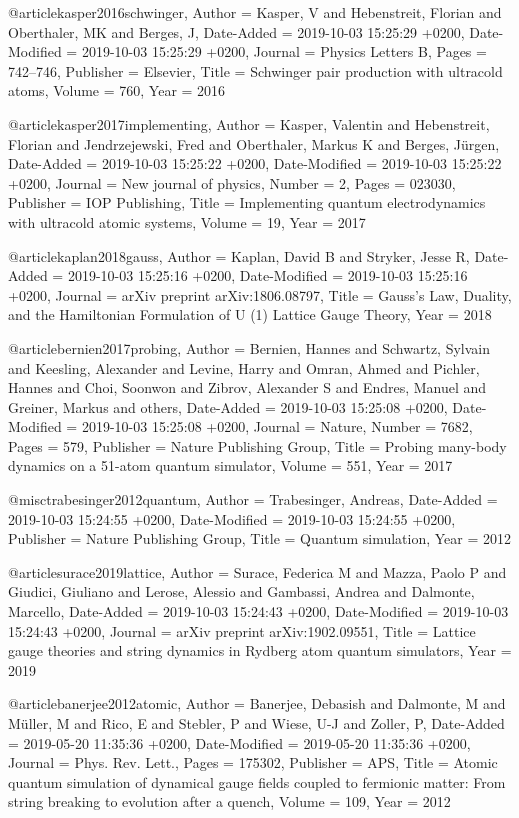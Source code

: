\documentclass[epj,final]{svjour}
\begin{document}
@article{kasper2016schwinger,
	Author = {Kasper, V and Hebenstreit, Florian and Oberthaler, MK and Berges, J},
	Date-Added = {2019-10-03 15:25:29 +0200},
	Date-Modified = {2019-10-03 15:25:29 +0200},
	Journal = {Physics Letters B},
	Pages = {742--746},
	Publisher = {Elsevier},
	Title = {Schwinger pair production with ultracold atoms},
	Volume = {760},
	Year = {2016}}

@article{kasper2017implementing,
	Author = {Kasper, Valentin and Hebenstreit, Florian and Jendrzejewski, Fred and Oberthaler, Markus K and Berges, J{\"u}rgen},
	Date-Added = {2019-10-03 15:25:22 +0200},
	Date-Modified = {2019-10-03 15:25:22 +0200},
	Journal = {New journal of physics},
	Number = {2},
	Pages = {023030},
	Publisher = {IOP Publishing},
	Title = {Implementing quantum electrodynamics with ultracold atomic systems},
	Volume = {19},
	Year = {2017}}

@article{kaplan2018gauss,
	Author = {Kaplan, David B and Stryker, Jesse R},
	Date-Added = {2019-10-03 15:25:16 +0200},
	Date-Modified = {2019-10-03 15:25:16 +0200},
	Journal = {arXiv preprint arXiv:1806.08797},
	Title = {Gauss's Law, Duality, and the Hamiltonian Formulation of U (1) Lattice Gauge Theory},
	Year = {2018}}

@article{bernien2017probing,
	Author = {Bernien, Hannes and Schwartz, Sylvain and Keesling, Alexander and Levine, Harry and Omran, Ahmed and Pichler, Hannes and Choi, Soonwon and Zibrov, Alexander S and Endres, Manuel and Greiner, Markus and others},
	Date-Added = {2019-10-03 15:25:08 +0200},
	Date-Modified = {2019-10-03 15:25:08 +0200},
	Journal = {Nature},
	Number = {7682},
	Pages = {579},
	Publisher = {Nature Publishing Group},
	Title = {Probing many-body dynamics on a 51-atom quantum simulator},
	Volume = {551},
	Year = {2017}}

@misc{trabesinger2012quantum,
	Author = {Trabesinger, Andreas},
	Date-Added = {2019-10-03 15:24:55 +0200},
	Date-Modified = {2019-10-03 15:24:55 +0200},
	Publisher = {Nature Publishing Group},
	Title = {Quantum simulation},
	Year = {2012}}

@article{surace2019lattice,
	Author = {Surace, Federica M and Mazza, Paolo P and Giudici, Giuliano and Lerose, Alessio and Gambassi, Andrea and Dalmonte, Marcello},
	Date-Added = {2019-10-03 15:24:43 +0200},
	Date-Modified = {2019-10-03 15:24:43 +0200},
	Journal = {arXiv preprint arXiv:1902.09551},
	Title = {Lattice gauge theories and string dynamics in Rydberg atom quantum simulators},
	Year = {2019}}

@article{banerjee2012atomic,
	Author = {Banerjee, Debasish and Dalmonte, M and M{\"u}ller, M and Rico, E and Stebler, P and Wiese, U-J and Zoller, P},
	Date-Added = {2019-05-20 11:35:36 +0200},
	Date-Modified = {2019-05-20 11:35:36 +0200},
	Journal = {Phys. Rev. Lett.},
	Pages = {175302},
	Publisher = {APS},
	Title = {Atomic quantum simulation of dynamical gauge fields coupled to fermionic matter: From string breaking to evolution after a quench},
	Volume = {109},
	Year = {2012}}
\end{document}
